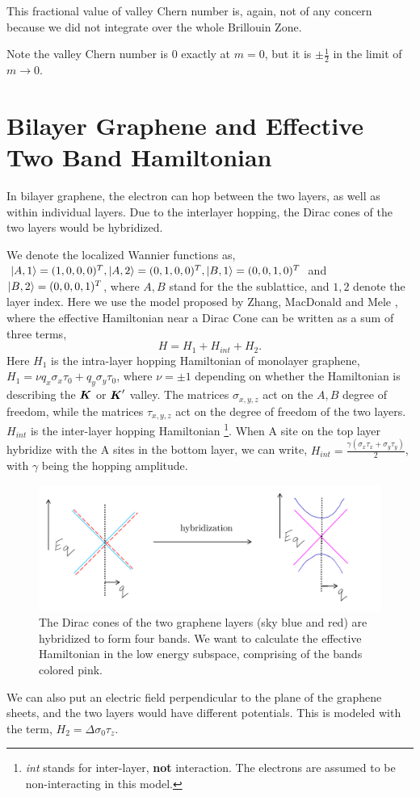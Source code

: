 \documentclass{report}
\renewcommand\vec[1]{\ensuremath\boldsymbol{#1}} %
\begin{document}
This fractional value of valley Chern number is, again, not of any concern because we did not integrate over the whole Brillouin Zone.

Note the valley Chern number is $0$ exactly at $m= 0$, but it is $\pm \frac{1}{2}$ in the limit of $m \rightarrow 0$.

\section{Bilayer Graphene and Effective Two Band Hamiltonian}
In bilayer graphene, the electron can hop between the two layers, as well as within individual layers. Due to the interlayer hopping, the Dirac cones of the two layers would be hybridized.

We denote the localized Wannier functions as, $\ket{A,1} = (1,0,0,0)^T, \ket{A,2} = (0,1,0,0)^T, \ket{B,1} = (0,0,1,0)^T$ and $\ket{B,2} = (0,0,0,1)^T$, where $A,B$ stand for the the sublattice, and $1,2$ denote the layer index.
Here we use the model proposed by Zhang, MacDonald and Mele \cite{Zhang10546}, where the effective Hamiltonian near a Dirac Cone can be written as a sum of three terms,
$$ H = H_1 + H_{int} + H_2. $$
Here $H_1$ is the intra-layer hopping Hamiltonian of monolayer graphene, $H_1 = \nu q_{x} \sigma_{x} \tau_{0}+q_{y} \sigma_{y} \tau_{0}$, where $\nu = \pm 1$ depending on whether the Hamiltonian is describing the $\vec{K}$ or $\vec{K}'$ valley. The matrices $\sigma_{x,y,z}$ act on the $A, B$ degree of freedom, while the matrices $\tau_{x,y,z}$ act on the degree of freedom of the two layers.
$H_{int}$ is the inter-layer hopping Hamiltonian \footnote{\textit{int} stands for inter-layer, \textbf{not} interaction. The electrons are assumed to be non-interacting in this model.}.
When A site on the top layer hybridize with the A sites in the bottom layer, we can write,
$H_{int} = \frac{\gamma\left(\sigma_{x} \tau_{x}+\sigma_{y} \tau_{y}\right)}{2}$, with $\gamma$ being the hopping amplitude.
\begin{figure}[h!]
	\centering
	\includegraphics[width=0.7\linewidth]{hybridization.pdf}
	\caption{The Dirac cones of the two graphene layers (sky blue and red) are hybridized to form four bands. We want to calculate the effective Hamiltonian in the low energy subspace, comprising of the bands colored pink.}
	\label{fig:hybridization}
\end{figure}
We can also put an electric field perpendicular to the plane of the graphene sheets, and the two layers would have different potentials. This is modeled with the term, $H_2 = \Delta \sigma_0 \tau_z$. 
\end{document}
